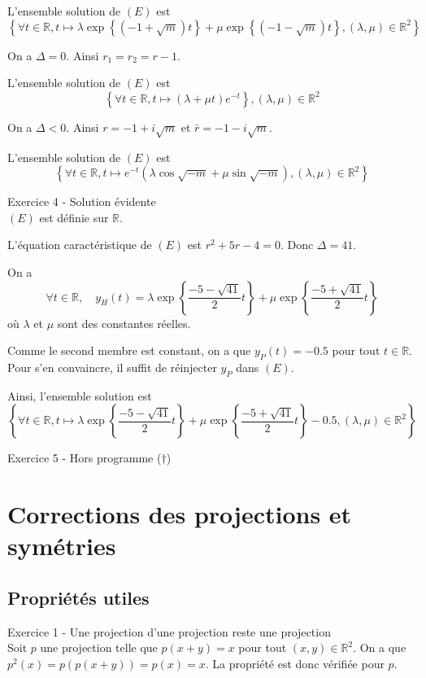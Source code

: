 \documentclass[a4paper, titlepage]{article}
\newenvironment{lititle}%
{\vspace{7mm}\LobsterTwo \large}%
{\\}
\begin{document}
	L'ensemble solution de $(E)$ est $$ \left\{ \forall t\in\mathbb{R},t\longmapsto \lambda\exp\left\{ (-1+\sqrt m)t \right\}+\mu\exp\left\{ (-1-\sqrt m)t \right\}, (\lambda,\mu)\in\mathbb{R}^2 \right\}  $$

	 On a $\Delta = 0$. Ainsi $r_1 = r_2 = r -1$.

	L'ensemble solution de $(E)$ est $$ \left\{ \forall t\in\mathbb{R},t\longmapsto (\lambda+\mu t)e^{-t} \right\} ,(\lambda,\mu)\in\mathbb{R}^2 $$

	 On a $\Delta < 0$. Ainsi $r = -1+i\sqrt m$ et $\bar r = -1-i\sqrt m$.

	L'ensemble solution de $(E)$ est $$ \left\{ \forall t\in\mathbb{R}, t\longmapsto e^{-t}\left( \lambda\cos\sqrt{-m}+\mu\sin\sqrt{-m} \right), (\lambda,\mu)\in\mathbb{R}^2  \right\}  $$

	\begin{lititle}
		Exercice 4 - Solution évidente
	\end{lititle}
	$(E)$ est définie sur $\mathbb{R}$.

	L'équation caractéristique de $(E)$ est $r^2+5r-4=0$. Donc $\Delta = 41$.

	On a $$ \forall t\in\mathbb{R},\quad y_H(t) = \lambda\exp\left\{ \frac{-5-\sqrt{41}}{2} t \right\} +\mu\exp\left\{ \frac{-5+\sqrt{41}}{2} t \right\}  $$
	où $\lambda$ et $\mu$ sont des constantes réelles.

	Comme le second membre est constant, on a que $y_P(t) = -0.5$ pour tout $t\in\mathbb{R}$. Pour s'en convaincre, il suffit de réinjecter $y_P$ dans $(E)$.

	Ainsi, l'ensemble solution est
	$$ \left\{ \forall t\in\mathbb{R},t\longmapsto \lambda\exp\left\{ \frac{-5-\sqrt{41}}{2} t \right\} +\mu\exp\left\{ \frac{-5+\sqrt{41}}{2} t \right\}-0.5,(\lambda,\mu)\in\mathbb{R}^2 \right\}  $$

	\begin{lititle}
		Exercice 5 - Hors programme ($\dagger$)
	\end{lititle}
	\section{Corrections des projections et symétries}
	\subsection{Propriétés utiles}
	\begin{lititle}
		Exercice 1 - Une projection d'une projection reste une projection
	\end{lititle}
	Soit $p$ une projection telle que $p(x+y) = x$ pour tout $(x,y)\in\mathbb{R}^2$. On a que $p^2(x) = p(p(x+y)) = p(x) = x$. La propriété est donc vérifiée pour $p$.
\end{document}
